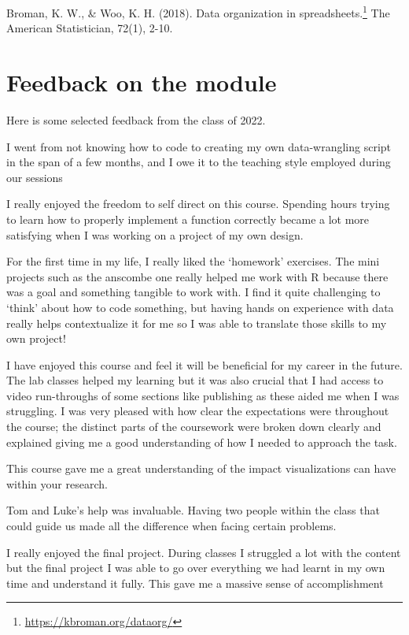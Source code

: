 \documentclass[
  12pt,
  a5paper,
]{book}
\DeclareRobustCommand{\href}[2]{#2\footnote{\url{#1}}}
\begin{document}
Broman, K. W., \& Woo, K. H. (2018). \href{https://kbroman.org/dataorg/}{Data organization in spreadsheets.} The American Statistician, 72(1), 2-10.

\hspace{0pt}

\hypertarget{feedback-on-the-module}{%
\section{Feedback on the module}\label{feedback-on-the-module}}

Here is some selected feedback from the class of 2022.

I went from not knowing how to code to creating my own data-wrangling script in the span of a few months, and I owe it to the teaching style employed during our sessions

I really enjoyed the freedom to self direct on this course. Spending hours trying to learn how to properly implement a function correctly became a lot more satisfying when I was working on a project of my own design.

For the first time in my life, I really liked the `homework' exercises. The mini projects such as the anscombe one really helped me work with R because there was a goal and something tangible to work with. I find it quite challenging to `think' about how to code something, but having hands on experience with data really helps contextualize it for me so I was able to translate those skills to my own project!

I have enjoyed this course and feel it will be beneficial for my career in the future. The lab classes helped my learning but it was also crucial that I had access to video run-throughs of some sections like publishing as these aided me when I was struggling. I was very pleased with how clear the expectations were throughout the course; the distinct parts of the coursework were broken down clearly and explained giving me a good understanding of how I needed to approach the task.

This course gave me a great understanding of the impact visualizations can have within your research.

Tom and Luke's help was invaluable. Having two people within the class that could guide us made all the difference when facing certain problems.

I really enjoyed the final project. During classes I struggled a lot with the content but the final project I was able to go over everything we had learnt in my own time and understand it fully. This gave me a massive sense of accomplishment
\end{document}
